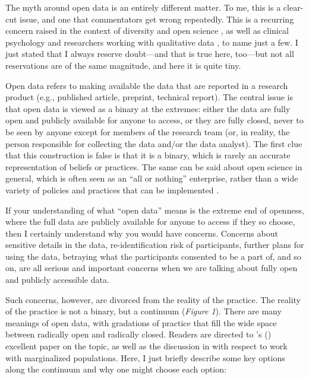 \documentclass[authordate, empirical]{jote-new-article}
\begin{document}
The myth around open data is an entirely different matter. To me, this is a clear-cut issue, and one that commentators get wrong repeatedly. This is a recurring concern raised in the context of diversity and open science \parencites[e.g.,][]{FoxTree2022}{Grzanka2021}, as well as clinical psychology \parencites[see][]{Tackett2017} and researchers working with qualitative data \parencites[see][]{Field2021}, to name just a few. I just stated that I always reserve doubt—and that is true here, too—but not all reservations are of the same magnitude, and here it is quite tiny.







Open data refers to making available the data that are reported in a research product (e.g., published article, preprint, technical report). The central issue is that open data is viewed as a binary at the extremes: either the data are fully open and publicly available for anyone to access, or they are fully closed, never to be seen by anyone except for members of the research team (or, in reality, the person responsible for collecting the data and/or the data analyst). The first clue that this construction is false is that it is a binary, which is rarely an accurate representation of beliefs or practices. The same can be said about open science in general, which is often seen as an “all or nothing” enterprise, rather than a wide variety of policies and practices that can be implemented \parencites[see][]{Bergmann2023}{Kathawalla2021}{Silverstein2024}.







If your understanding of what “open data” means is the extreme end of openness, where the full data are publicly available for anyone to access if they so choose, then I certainly understand why you would have concerns. Concerns about sensitive details in the data, re-identification risk of participants, further plans for using the data, betraying what the participants consented to be a part of, and so on, are all serious and important concerns when we are talking about fully open and publicly accessible data.







Such concerns, however, are divorced from the reality of the practice. The reality of the practice is not a binary, but a continuum (\emph{Figure 1}). There are many meanings of open data, with gradations of practice that fill the wide space between radically open and radically closed. Readers are directed to \citeauthor{Meyer2018}'s \mbox{(\hspace*{-2pt}\citeyear{Meyer2018})} excellent paper on the topic, as well as the discussion in \textcite{Syed2022} with respect to work with marginalized populations. Here, I just briefly describe some key options along the continuum and why one might choose each option:
\end{document}
